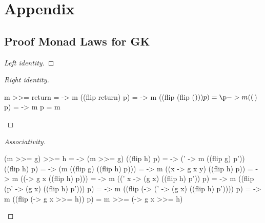 \documentclass[runningheads]{llncs}
\begin{document}
%
%
%
% 
% 
%



\newpage
\section*{Appendix}
\appendix
\subsection*{Proof Monad Laws for GK}\label{GK-monad-laws}
\begin{proof}[Left identity]
\end{proof}
\begin{proof}[Right identity]
\begin{haskell}
m >>= return
= \p -> m ((flip return) p)
= \p -> m ((flip (flip ($))) p)
= \p -> m (($) p)
= \p -> m p
= m
\end{haskell}
\end{proof}
\begin{proof}[Associativity]
\begin{haskell}
(m >>= g) >>= h
= \p -> (m >>= g) ((flip h) p)
= \p -> (\p' -> m ((flip g) p')) ((flip h) p)
= \p -> (m ((flip g) ((flip h) p)))
= \p -> m ((\y x -> g x y) ((flip h) p))
= \p -> m ((\x -> g x ((flip h) p)))
= \p -> m ((\p' x -> (g x) ((flip h) p')) p)
= \p -> m ((flip (\x p' -> (g x) ((flip h) p'))) p)
= \p -> m ((flip (\x -> (\p' -> (g x) ((flip h) p')))) p)
= \p -> m ((flip (\x -> g x >>= h)) p)
= m >>= (\x -> g x >>= h)
\end{haskell}
\end{proof}
\end{document}
